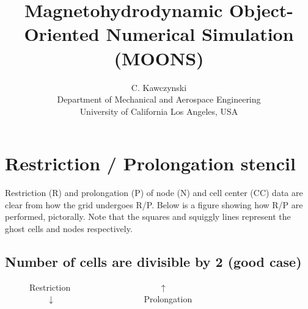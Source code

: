 \documentclass[11pt]{article}
\newcommand{\height}{0.4}
\newcommand{\radius}{0.1}
\newcommand{\dx}{1}
\newcommand{\w}{1}
\newcommand{\qq}{$\qquad \qquad \qquad \qquad \qquad$}
\newcommand{\qe}{$\qquad$}
\begin{document}
\doublespacing
\title{Magnetohydrodynamic Object-Oriented Numerical Simulation (MOONS)}
\author{C. Kawczynski \\
Department of Mechanical and Aerospace Engineering \\
University of California Los Angeles, USA\\
}
\maketitle

\section{Restriction / Prolongation stencil}
Restriction (R) and prolongation (P) of node (N) and cell center (CC) data are clear from how the grid undergoes R/P. Below is a figure showing how R/P are performed, pictorally. Note that the squares and squiggly lines represent the ghost cells and nodes respectively.\\

\subsection{Number of cells are divisible by 2 (good case)}

\begin{figure}[h!]
  \begin{center}
    \caption*{Restriction \qq $\uparrow$ \qe \\ \qe $\downarrow$ \qq Prolongation}
  \end{center}
\end{figure}
\end{document}
